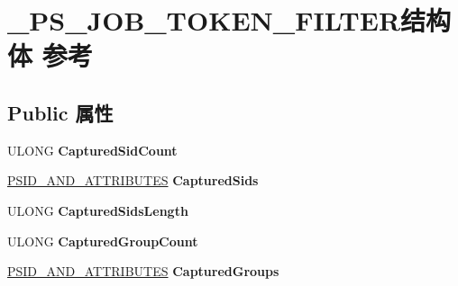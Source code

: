 \hypertarget{struct___p_s___j_o_b___t_o_k_e_n___f_i_l_t_e_r}{}\section{\+\_\+\+P\+S\+\_\+\+J\+O\+B\+\_\+\+T\+O\+K\+E\+N\+\_\+\+F\+I\+L\+T\+E\+R结构体 参考}
\label{struct___p_s___j_o_b___t_o_k_e_n___f_i_l_t_e_r}
\subsection*{Public 属性}
\begin{DoxyCompactItemize}
\item 
\mbox{\label{struct___p_s___j_o_b___t_o_k_e_n___f_i_l_t_e_r_a63bb3ac1131812204cbeeb84a61a4f11}} 
U\+L\+O\+NG {\bfseries Captured\+Sid\+Count}
\item 
\mbox{\label{struct___p_s___j_o_b___t_o_k_e_n___f_i_l_t_e_r_a646fc52cd235f24a6ee6f4bdbddc5fbf}} 
\hyperlink{struct___s_i_d___a_n_d___a_t_t_r_i_b_u_t_e_s}{P\+S\+I\+D\+\_\+\+A\+N\+D\+\_\+\+A\+T\+T\+R\+I\+B\+U\+T\+ES} {\bfseries Captured\+Sids}
\item 
\mbox{\label{struct___p_s___j_o_b___t_o_k_e_n___f_i_l_t_e_r_a22a725e2bc210ee04d35e613994596dd}} 
U\+L\+O\+NG {\bfseries Captured\+Sids\+Length}
\item 
\mbox{\label{struct___p_s___j_o_b___t_o_k_e_n___f_i_l_t_e_r_a972d96fa96385a7b30deebdbce05bd48}} 
U\+L\+O\+NG {\bfseries Captured\+Group\+Count}
\item 
\mbox{\label{struct___p_s___j_o_b___t_o_k_e_n___f_i_l_t_e_r_ab7e0992b3570476d19537a98ed06371b}} 
\hyperlink{struct___s_i_d___a_n_d___a_t_t_r_i_b_u_t_e_s}{P\+S\+I\+D\+\_\+\+A\+N\+D\+\_\+\+A\+T\+T\+R\+I\+B\+U\+T\+ES} {\bfseries Captured\+Groups}
\item 
\mbox{\label{struct___p_s___j_o_b___t_o_k_e_n___f_i_l_t_e_r_a70a59ec8f478acf006fbfff4eea7e912}} 

\end{DoxyCompactItemize}
